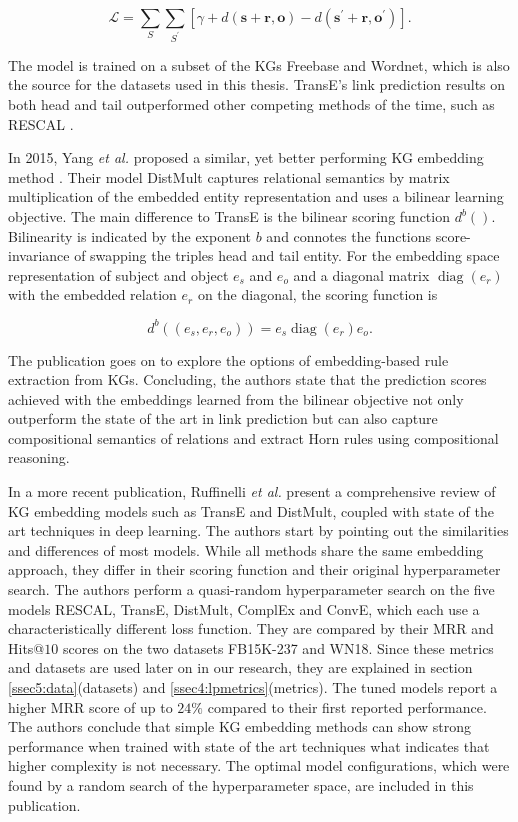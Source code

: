 \begin{equation}
    \mathcal{L}=\sum_{S} \sum_{S^{\prime}} \left[\gamma+d(\boldsymbol{s}+\boldsymbol{r}, \boldsymbol{o})-d\left(\boldsymbol{s}^{\prime}+\boldsymbol{r}, \boldsymbol{o}^{\prime}\right)\right].
\end{equation}

The model is trained on a subset of the KGs Freebase and Wordnet, which is also the source for the datasets used in this thesis. TransE's link prediction results on both head and tail outperformed other competing methods of the time, such as RESCAL \cite{nickel_three-way_nodate}.

In 2015, Yang \textit{et al.} proposed a similar, yet better performing KG embedding method \cite{yang_embedding_2015}. Their model DistMult captures relational semantics by matrix multiplication of the embedded entity representation and uses a bilinear learning objective. The main difference to TransE is the bilinear scoring function $d^{b}()$. Bilinearity is indicated by the exponent $b$ and connotes the functions score-invariance of swapping the triples head and tail entity. For the embedding space representation of subject and object $e_s$ and $e_{o}$ and a diagonal matrix $\operatorname{diag}(e_{r})$ with the embedded relation $e_r$ on the diagonal, the scoring function is

\begin{equation}
    d^{b}\left((e_s,e_r,e_o)\right)=e_s \operatorname{diag}(e_{r}) e_o.
    \label{eq2:distmult}
\end{equation}

The publication goes on to explore the options of embedding-based rule extraction from KGs. Concluding, the authors state that the prediction scores achieved with the embeddings learned from the bilinear objective not only outperform the state of the art in link prediction but can also capture compositional semantics of relations and extract Horn rules using compositional reasoning.

In a more recent publication, Ruffinelli \textit{et al.} present a comprehensive review of KG embedding models such as TransE and DistMult, coupled with state of the art techniques in deep learning. The authors start by pointing out the similarities and differences of most models. While all methods share the same embedding approach, they differ in their scoring function and their original hyperparameter search. The authors perform a quasi-random hyperparameter search on the five models RESCAL, TransE, DistMult, ComplEx and ConvE, which each use a characteristically different loss function. They are compared by their MRR and Hits@$10$ scores on the two datasets FB15K-237 and WN18. Since these metrics and datasets are used later on in our research, they are explained in section \ref{ssec5:data}(datasets) and \ref{ssec4:lpmetrics}(metrics). The tuned models report a higher MRR score of up to $24\%$ compared to their first reported performance. The authors conclude that simple KG embedding methods can show strong performance when trained with state of the art techniques what indicates that higher complexity is not necessary. The optimal model configurations, which were found by a random search of the hyperparameter space, are included in this publication. 

